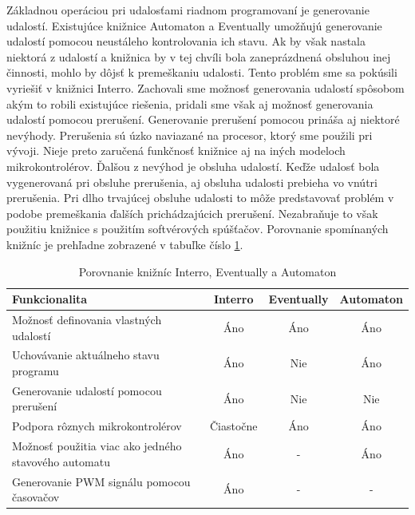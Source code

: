 Základnou operáciou pri udalosťami riadnom programovaní je generovanie udalostí. Existujúce knižnice Automaton a Eventually umožňujú generovanie udalostí pomocou
neustáleho kontrolovania ich stavu. Ak by však nastala niektorá z udalostí a knižnica by v tej chvíli bola zaneprázdnená obsluhou inej činnosti,
mohlo by dôjsť k premeškaniu udalosti. Tento problém sme sa pokúsili vyriešiť v knižnici Interro. Zachovali sme
možnosť generovania udalostí spôsobom akým to robili existujúce riešenia, pridali sme však aj možnosť generovania udalostí pomocou prerušení. Generovanie prerušení pomocou
prináša aj niektoré nevýhody. Prerušenia sú úzko naviazané na procesor, ktorý sme použili pri vývoji. Nieje preto zaručená funkčnosť knižnice aj na iných modeloch
mikrokontrolérov. Ďalšou z nevýhod je obsluha udalostí. Keďže udalosť bola vygenerovaná pri obsluhe prerušenia, aj obsluha udalosti prebieha vo vnútri prerušenia.
Pri dlho trvajúcej obsluhe udalosti to môže predstavovať problém v podobe premeškania ďalších prichádzajúcich prerušení. Nezabraňuje to však použitiu knižnice s použitím
softvérových spúšťačov.
Porovnanie spomínaných knižníc je prehľadne zobrazené v tabuľke číslo \ref{table:library-compare}.
\begin{table}[!htbp]
    \begin{center}
        \begin{tabular}{| m{20em} | c | c | c |}
            \hline
            Funkcionalita                                        & Interro   & Eventually & Automaton \\
            \hline
            Možnosť definovania vlastných udalostí               & Áno       & Áno        & Áno       \\
            \hline
            Uchovávanie aktuálneho stavu programu                & Áno       & Nie        & Áno       \\
            \hline
            Generovanie udalostí pomocou prerušení               & Áno       & Nie        & Nie       \\
            \hline
            Podpora rôznych mikrokontrolérov                     & Čiastočne & Áno        & Áno       \\
            \hline
            Možnosť použitia viac ako jedného stavového automatu & Áno       & -          & Áno       \\
            \hline
            Generovanie PWM signálu pomocou časovačov            & Áno       & -          & -         \\
            \hline
        \end{tabular}
        \caption{Porovnanie knižníc Interro, Eventually a Automaton}
        \label{table:library-compare}
    \end{center}
\end{table}

